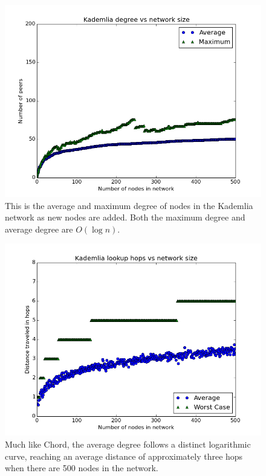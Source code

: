 \begin{figure}
	\centering
	\includegraphics[width=\linewidth]{figs/KademliaDegree}
	\caption{This is the average and maximum degree of nodes in the Kademlia network as new nodes are added.  Both the maximum degree and average degree are $O(\log n)$.}
	\label{fig:KademliaDegree}
\end{figure}
\begin{figure}
	\centering
	\includegraphics[width=\linewidth]{figs/KademliaDistance}
	\caption{Much like Chord, the average degree follows a distinct logarithmic curve, reaching an average distance of approximately three hops when there are 500 nodes in the network.}
	\label{fig:KademliaDistance}
\end{figure}



